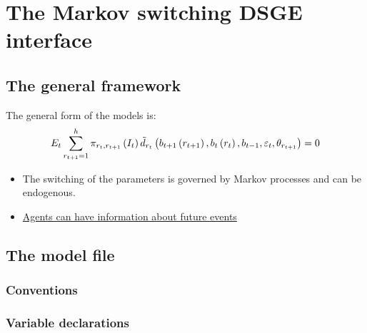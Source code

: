 \documentclass[letterpaper,10pt,english]{sphinxmanual}
\begin{document}
\chapter{The Markov switching DSGE interface}
\label{dsge_interface:the-markov-switching-dsge-interface}\label{dsge_interface::doc}

\section{The general framework}
\label{dsge_interface:the-general-framework}
The general form of the models is:
\begin{gather}
\begin{split}E_{t}\sum_{r_{t+1}=1}^{h}\pi _{r_{t},r_{t+1}}\left( I_{t}\right) \tilde{d}_{r_{t}}\left(b_{t+1}
\left( r_{t+1}\right),b_{t}\left( r_{t}\right),b_{t-1},\varepsilon _{t}, \theta _{r_{t+1}}\right) =0\end{split}\notag
\end{gather}\begin{itemize}
\item {} 
The switching of the parameters is governed by Markov processes and can be endogenous.

\item {} 
\href{http://www.kansascityfed.org/publicat/events/research/2010CenBankForecasting/Maih\_paper.pdf}{Agents can have information about future events}

\end{itemize}


\section{The model file}
\label{dsge_interface:the-model-file}

\subsection{Conventions}
\label{dsge_interface:conventions}

\subsection{Variable declarations}
\label{dsge_interface:variable-declarations}
\end{document}
